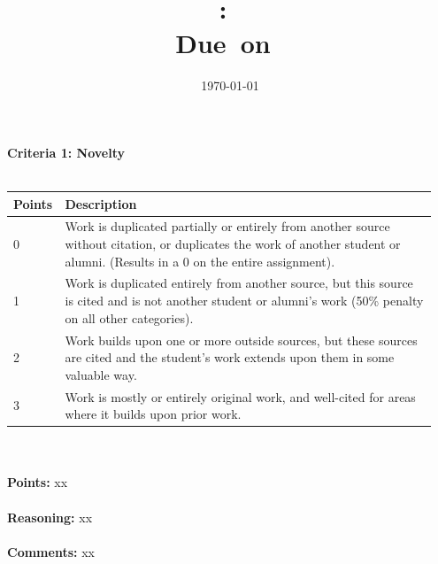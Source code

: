 \documentclass{article}
\title{
    \vspace{2in}
    \textmd{\textbf{\ReviewClass:\ \ReviewTitle}}\\
    \normalsize\vspace{0.1in}\small{Due\ on\ \ReviewDueDate}\\
    \vspace{3in}
}
\author{\ReviewAuthorName}
\date{\today}
\begin{document}
\maketitle
\pagebreak


\textbf{\large Criteria 1: Novelty} \\
\hspace{1cm} \\
\begin{tabular}{|p{0.075\linewidth}||p{0.875\linewidth}|}
    \hline
    \textbf{Points} & \textbf{Description} \\
    \hline
    \hline
    0      & Work is duplicated partially or entirely from another source without citation, or duplicates the work of another student or alumni. (Results in a 0 on the entire assignment). \\
    \hline
    1      & Work is duplicated entirely from another source, but this source is cited and is not another student or alumni's work (50\% penalty on all other categories). \\
    \hline
    2      & Work builds upon one or more outside sources, but these sources are cited and the student's work extends upon them in some valuable way. \\
    \hline
    3      & Work is mostly or entirely original work, and well-cited for areas where it builds upon prior work. \\
    \hline
\end{tabular} \\

\hspace{1cm} \\
\textbf{\large Points: } xx \\

\hspace{1cm} \\
\textbf{\large Reasoning: } xx \\

\hspace{1cm} \\
\textbf{\large Comments: } xx \\

\pagebreak
\end{document}
